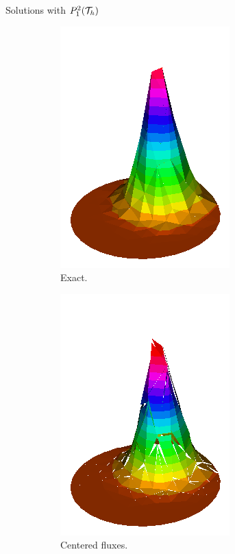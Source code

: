 		\begin{frame}{Solutions with $\relax{P}_1^2(\mathcal{T}_h)$}
		\vspace{-0.2cm}
		\begin{figure}[h!]
			\begin{subfigure}[b]{0.27\textwidth}
				\centering
				\includegraphics[scale=0.2]{img/Conveccion_Reaccion/Recortes/steady_convect_react_exact_n_32.png}
				\caption{Exact.}
			\end{subfigure}
			\begin{subfigure}[b]{0.27\textwidth}
				\centering
				\includegraphics[scale=0.2]{img/Conveccion_Reaccion/Recortes/steady_convect_react_approx_CF_n_32.png}
				\caption{Centered fluxes.}
			\end{subfigure}
			\begin{subfigure}[b]{0.27\textwidth}

\end{subfigure}
\end{figure}
\end{frame}

